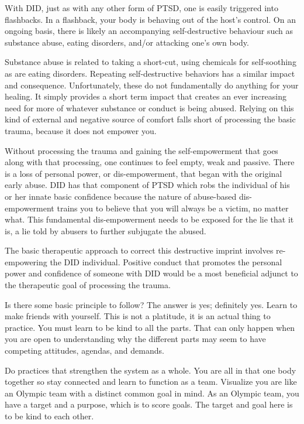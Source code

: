 \documentclass[]{book}
\begin{document}
With DID, just as with any other form of PTSD, one is easily triggered into flashbacks. In a flashback, your body is behaving out of the host's control. On an ongoing basis, there is likely an accompanying self-destructive behaviour such as substance abuse, eating disorders, and/or attacking one's own body.

Substance abuse is related to taking a short-cut, using chemicals for self-soothing as are eating disorders. Repeating self-destructive behaviors has a similar impact and consequence. Unfortunately, these do not fundamentally do anything for your healing. It simply provides a short term impact that creates an ever increasing need for more of whatever substance or conduct is being abused. Relying on this kind of external and negative source of comfort falls short of processing the basic trauma, because it does not empower you.

Without processing the trauma and gaining the self-empowerment that goes along with that processing, one continues to feel empty, weak and passive. There is a loss of personal power, or dis-empowerment, that began with the original early abuse. DID has that component of PTSD which robs the individual of his or her innate basic confidence because the nature of abuse-based dis-empowerment trains you to believe that you will always be a victim, no matter what. This fundamental dis-empowerment needs to be exposed for the lie that it is, a lie told by abusers to further subjugate the abused.

The basic therapeutic approach to correct this destructive imprint involves re-empowering the DID individual. Positive conduct that promotes the personal power and confidence of someone with DID would be a most beneficial adjunct to the therapeutic goal of processing the trauma.

Is there some basic principle to follow? The answer is yes; definitely yes. Learn to make friends with yourself. This is not a platitude, it is an actual thing to practice. You must learn to be kind to all the parts. That can only happen when you are open to understanding why the different parts may seem to have competing attitudes, agendas, and demands.

Do practices that strengthen the system as a whole. You are all in that one body together so stay connected and learn to function as a team. Visualize you are like an Olympic team with a distinct common goal in mind. As an Olympic team, you have a target and a purpose, which is to score goals. The target and goal here is to be kind to each other.
\end{document}
